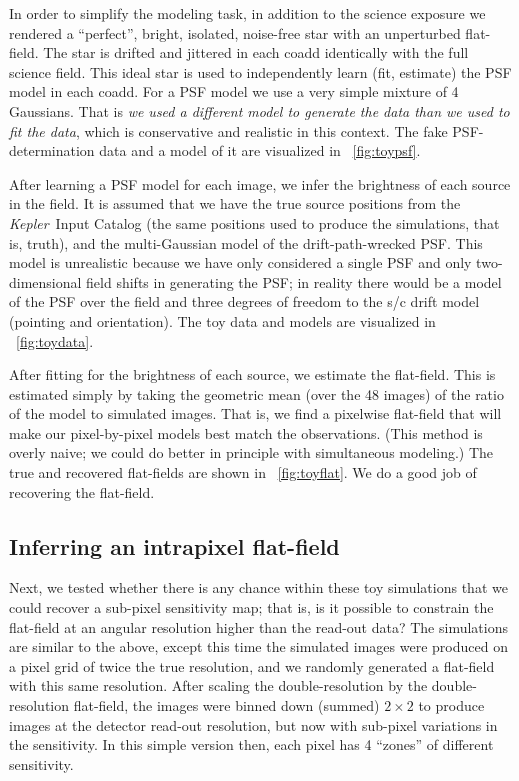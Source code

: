 \documentclass[letterpaper,12pt,whitepaper]{haastex}
\newcommand{\observatory}[1]{\textsl{#1}}
\newcommand{\Kepler}{\observatory{Kepler}}
\begin{document}
In order to simplify the modeling task,
  in addition to the science exposure
  we rendered a ``perfect'', bright, isolated, noise-free star with an unperturbed flat-field.
The star is drifted and jittered in each coadd identically with the full science field.
This ideal star is used to independently learn (fit, estimate) the PSF model in each coadd.
For a PSF model we use a very simple mixture of 4 Gaussians.
That is \emph{we used a different model to generate the data than we used to fit the data},
  which is conservative and realistic in this context.
The fake PSF-determination data and a model of it are visualized in \figurename~\ref{fig:toypsf}.

After learning a PSF model for each image,
  we infer the brightness of each source in the field.
It is assumed that we have the true source positions from the \Kepler\ Input Catalog
  (the same positions used to produce the simulations, that is, truth),
  and the multi-Gaussian model of the drift-path-wrecked PSF.
This model is unrealistic because we have only considered a single PSF and only two-dimensional
  field shifts in generating the PSF;
  in reality there would be a model of the PSF over the field
  and three degrees of freedom to the s/c drift model (pointing and orientation).
The toy data and models are visualized in  \figurename~\ref{fig:toydata}.

After fitting for the brightness of each source,
   we estimate the flat-field.
This is estimated simply by taking
  the geometric mean (over the 48 images) of the ratio of the model to simulated images.
That is, we find a pixelwise flat-field that will make our pixel-by-pixel
models best match the observations.
(This method is overly naive; we could do better in principle with simultaneous modeling.)
The true and recovered flat-fields are shown in \figurename~\ref{fig:toyflat}.
We do a good job of recovering the flat-field.

\subsection{Inferring an intrapixel flat-field}\label{sec:intrapixel}

Next, we tested whether there is any chance within these toy simulations
  that we could recover a sub-pixel sensitivity map;
  that is, is it possible to constrain the flat-field at an angular resolution
  higher than the read-out data?
The simulations are similar to the above,
  except this time the simulated images were produced on a pixel grid of twice the true resolution,
  and we randomly generated a flat-field with this same resolution.
After scaling the double-resolution by the double-resolution flat-field,
  the images were binned down (summed) $2\times 2$ to produce images at the detector read-out resolution,
  but now with sub-pixel variations in the sensitivity.
In this simple version then, each pixel has 4 ``zones'' of different sensitivity.
\end{document}
